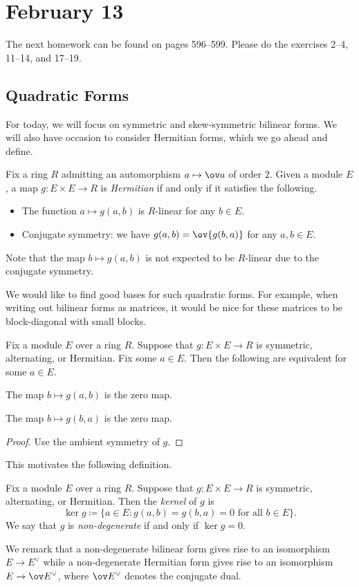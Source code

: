 \documentclass[../notes.tex]{subfiles}
\begin{document}
\section{February 13}
The next homework can be found on pages 596--599. Please do the exercises 2--4, 11--14, and 17--19.

\subsection{Quadratic Forms}
For today, we will focus on symmetric and skew-symmetric bilinear forms. We will also have occasion to consider Hermitian forms, which we go ahead and define.
\begin{definition}[Hermitian]
	Fix a ring $R$ admitting an automorphism $a\mapsto\ov a$ of order $2$. Given a module $E$, a map $g\colon E\times E\to R$ is \textit{Hermitian} if and only if it satisfies the following.
	\begin{itemize}
		\item The function $a\mapsto g(a,b)$ is $R$-linear for any $b\in E$.
		\item Conjugate symmetry: we have $g(a,b)=\ov{g(b,a)}$ for any $a,b\in E$.
	\end{itemize}
\end{definition}
Note that the map $b\mapsto g(a,b)$ is not expected to be $R$-linear due to the conjugate symmetry.

We would like to find good bases for such quadratic forms. For example, when writing out bilinear forms as matrices, it would be nice for these matrices to be block-diagonal with small blocks.
\begin{lemma}
	Fix a module $E$ over a ring $R$. Suppose that $g\colon E\times E\to R$ is symmetric, alternating, or Hermitian. Fix some $a\in E$. Then the following are equivalent for some $a\in E$.
	\begin{listroman}
		\item The map $b\mapsto g(a,b)$ is the zero map.
		\item The map $b\mapsto g(b,a)$ is the zero map.
	\end{listroman}
\end{lemma}
\begin{proof}
	Use the ambient symmetry of $g$.
\end{proof}
This motivates the following definition.
\begin{definition}[kernel]
	Fix a module $E$ over a ring $R$. Suppose that $g\colon E\times E\to R$ is symmetric, alternating, or Hermitian. Then the \textit{kernel} of $g$ is
	\[\ker g\coloneqq\{a\in E:g(a,b)=g(b,a)=0\text{ for all }b\in E\}.\]
	We say that $g$ is \textit{non-degenerate} if and only if $\ker g=0$.
\end{definition}
We remark that a non-degenerate bilinear form gives rise to an isomorphism $E\to E^\lor$ while a non-degen\-erate Hermitian form gives rise to an isomorphism $E\to\ov E^\lor$, where $\ov E^\lor$ denotes the conjugate dual.
\end{document}
